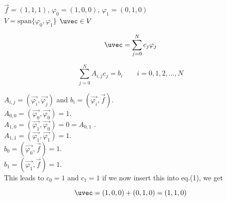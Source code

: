$\vec{f} = (1,1,1)$, $\varphi_0 = (1,0,0)$, $\varphi_1 = (0,1,0)$\\
$V = \text{span}\{\varphi_0, \varphi_1 \}$ $\uvec \in V$ 

\begin{equation}
  \uvec = \sum_{j=0}^{N} c_j \varphi_j
\end{equation}

\begin{equation}
  \sum_{j=0}^{N} A_{i,j} c_j = b_i \qquad i = 0,1,2,...,N
\end{equation}

$A_{i,j} = ( \vec{\varphi_{i}}, \vec{\varphi_{j}})$ and $b_{i} = ( \vec{\varphi_{i}}, \vec{f})$.\\

$A_{0,0} = ( \vec{\varphi_{0}}, \vec{\varphi_{0}}) = 1$.\\
$A_{1,0} = ( \vec{\varphi_{1}}, \vec{\varphi_{0}}) = 0 = A_{0,1}$ .\\
$A_{1,1} = ( \vec{\varphi_{1}}, \vec{\varphi_{1}}) = 1$.\\

$b_{0} = ( \vec{\varphi_{0}}, \vec{f}) = 1$.\\
$b_{1} = ( \vec{\varphi_{1}}, \vec{f}) = 1$.\\

This leads to $c_0 = 1$ and $c_1 = 1$ if we now insert this into eq.(1), we get

\begin{equation}
  \uvec = (1,0,0) + (0,1,0) = (1,1,0)
\end{equation}